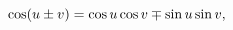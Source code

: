 \[\mathop{\cos\/}\nolimits\!\left(u\pm v\right)=\mathop{\cos\/}\nolimits u%
\mathop{\cos\/}\nolimits v\mp\mathop{\sin\/}\nolimits u\mathop{\sin\/}%
\nolimits v,\]